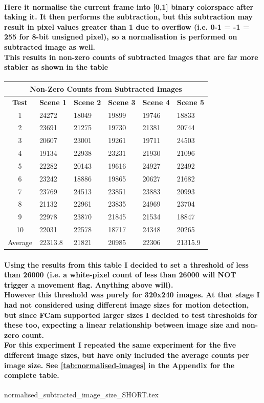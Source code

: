 \documentclass[11pt]{article} %
\begin{document}
\paragraph{Here it normalise the current frame into [0,1] binary colorspace after taking it. It then performs the subtraction, but this subtraction may result in pixel values greater than 1 due to overflow (i.e. 0-1 = -1 = 255 for 8-bit unsigned pixel), so a normalisation is performed on subtracted image as well. \\
This results in non-zero counts of subtracted images that are far more stabler as shown in the table}
\begin{center}
\begin{table}[!htbp]
	\begin{tabular}{| c | l | l | l | l | l | }
\hline
\multicolumn{6}{|c|}{\bf Non-Zero Counts from Subtracted Images} \\
\hline
\bf Test	&\bf Scene 1	&\bf Scene 2	&\bf Scene 3	&\bf Scene 4	&\bf Scene 5	\\ \hline
1	&24272	&18049	&19899	&19746	&18833\\
2	&23691	&21275	&19730	&21381	&20744\\
3	&20607	&23001	&19261	&19711	&24503\\
4	&19134	&22938	&23231	&21930	&21096\\
5	&22282	&20143	&19616	&24927	&22492\\
6	&23242	&18886	&19865	&20627	&21682\\
7	&23769	&24513	&23851	&23883	&20993\\
8	&21132	&22961	&23835	&24969	&23704\\
9	&22978	&23870	&21845	&21534	&18847\\
10	&22031	&22578	&18717	&24348	&20265\\ \hline
Average	&22313.8	&21821	&20985	&22306	&21315.9	\\ \hline
	\end{tabular}
	\label{tab:sub2}
\end{table}
\end{center}
\paragraph{Using the results from this table I decided to set a threshold of less than 26000 (i.e. a white-pixel count of less than 26000 will NOT trigger a movement flag. Anything above will). 
\\However this threshold was purely for 320x240 images. At that stage I had not considered using different image sizes  for motion detection, but since FCam supported larger sizes I decided to test thresholds for these too, expecting a linear relationship between image size and non-zero count.
\\For this experiment I repeated the same experiment for the five different image sizes, but have only included the average counts per image size. See \ref{tab:normalised-images} in the Appendix for the complete table.\\
}
{normalised_subtracted_image_size_SHORT.tex}
\end{document}
